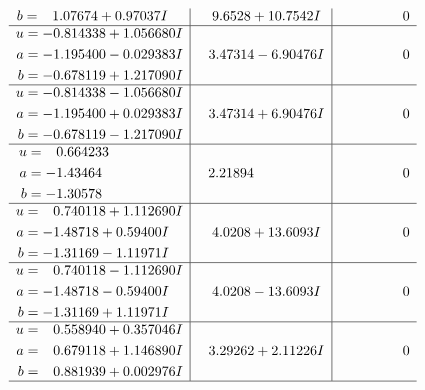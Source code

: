 \documentclass[1p]{elsarticle_modified}
\theoremstyle{definition}
\begin{document}
$$\begin{array}{c|c|c}
\begin{aligned}
b &= \phantom{-}1.07674 + 0.97037 I\end{aligned}
 & \phantom{-}9.6528 + 10.7542 I & \phantom{-0.000000 } 0 \\ \hline\begin{aligned}
u &= -0.814338 + 1.056680 I \\
a &= -1.195400 - 0.029383 I \\
b &= -0.678119 + 1.217090 I\end{aligned}
 & \phantom{-}3.47314 - 6.90476 I & \phantom{-0.000000 } 0 \\ \hline\begin{aligned}
u &= -0.814338 - 1.056680 I \\
a &= -1.195400 + 0.029383 I \\
b &= -0.678119 - 1.217090 I\end{aligned}
 & \phantom{-}3.47314 + 6.90476 I & \phantom{-0.000000 } 0 \\ \hline\begin{aligned}
u &= \phantom{-}0.664233\phantom{ +0.000000I} \\
a &= -1.43464\phantom{ +0.000000I} \\
b &= -1.30578\phantom{ +0.000000I}\end{aligned}
 & \phantom{-}2.21894\phantom{ +0.000000I} & \phantom{-0.000000 } 0 \\ \hline\begin{aligned}
u &= \phantom{-}0.740118 + 1.112690 I \\
a &= -1.48718 + 0.59400 I \\
b &= -1.31169 - 1.11971 I\end{aligned}
 & \phantom{-}4.0208 + 13.6093 I & \phantom{-0.000000 } 0 \\ \hline\begin{aligned}
u &= \phantom{-}0.740118 - 1.112690 I \\
a &= -1.48718 - 0.59400 I \\
b &= -1.31169 + 1.11971 I\end{aligned}
 & \phantom{-}4.0208 - 13.6093 I & \phantom{-0.000000 } 0 \\ \hline\begin{aligned}
u &= \phantom{-}0.558940 + 0.357046 I \\
a &= \phantom{-}0.679118 + 1.146890 I \\
b &= \phantom{-}0.881939 + 0.002976 I\end{aligned}
 & \phantom{-}3.29262 + 2.11226 I & \phantom{-0.000000 } 0\\
 \hline 

\end{array}$$
\end{document}
